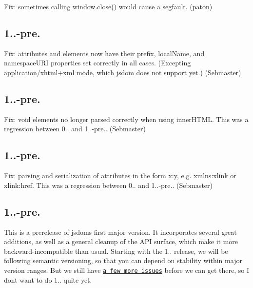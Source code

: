 \begin{DoxyItemize}
\item Fix\+: sometimes calling {\ttfamily window.\+close()} would cause a segfault. (paton)
\end{DoxyItemize}

\subsection*{1..-\/pre.}


\begin{DoxyItemize}
\item Fix\+: attributes and elements now have their {\ttfamily prefix}, {\ttfamily local\+Name}, and {\ttfamily namespace\+U\+RI} properties set correctly in all cases. (Excepting {\ttfamily application/xhtml+xml} mode, which jsdom does not support yet.) (Sebmaster)
\end{DoxyItemize}

\subsection*{1..-\/pre.}


\begin{DoxyItemize}
\item Fix\+: void elements no longer parsed correctly when using {\ttfamily inner\+H\+T\+ML}. This was a regression between 0.. and 1..-\/pre.. (Sebmaster)
\end{DoxyItemize}

\subsection*{1..-\/pre.}


\begin{DoxyItemize}
\item Fix\+: parsing and serialization of attributes in the form {\ttfamily x\+:y}, e.\+g. {\ttfamily xmlns\+:xlink} or {\ttfamily xlink\+:href}. This was a regression between 0.. and 1..-\/pre.. (Sebmaster)
\end{DoxyItemize}

\subsection*{1..-\/pre.}

This is a prerelease of jsdom\textquotesingle{}s first major version. It incorporates several great additions, as well as a general cleanup of the A\+PI surface, which make it more backward-\/incompatible than usual. Starting with the 1.. release, we will be following semantic versioning, so that you can depend on stability within major version ranges. But we still have \href{https://github.com/tmpvar/jsdom/issues?q=is%3Aopen+is%3Aissue+milestone%3A1.0}{\tt a few more issues} before we can get there, so I don\textquotesingle{}t want to do 1.\+0.\+0 quite yet.

